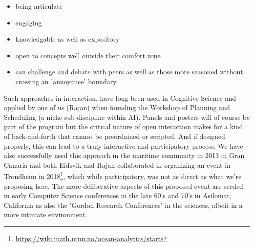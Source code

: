 \begin{itemize}
  \begin{itemize}

  \item being articulate
  \item engaging
  \item knowledgable as well as expository
  \item open to concepts well outside their comfort zone
  \item can challenge and debate with peers as well as those more
    seasoned without crossing an 'annoyance' boundary

  \end{itemize}

\end{itemize}  

\noindent
Such approaches in interaction, have long been used in Cognitive
Science and applied by one of us (Rajan) when founding the \nas
Workshop of Planning and Scheduling (a niche sub-discipline within
AI). Panels and posters will of course be part of the program but the
critical nature of open interaction makes for a kind of back-and-forth
that cannot be preordained or scripted. And if designed properly, this
can lead to a truly interactive and participatory process. We have
also successfully used this approach in the maritime community in 2013
in Gran Canaria and both Eidsvik and Rajan collaborated in organizing
an event in Trondheim in
2018\footnote{\url{https://wiki.math.ntnu.no/ocean-analytics/start}},
which while participatory, was not as direct as what we're proposing
here. The more deliberative aspects of this proposed event are seeded
in early Computer Science conferences in the late 60's and 70's in
Asilomar, California as also the 'Gordon Research Conferences' in the
sciences, albeit in a more intimate environment.

